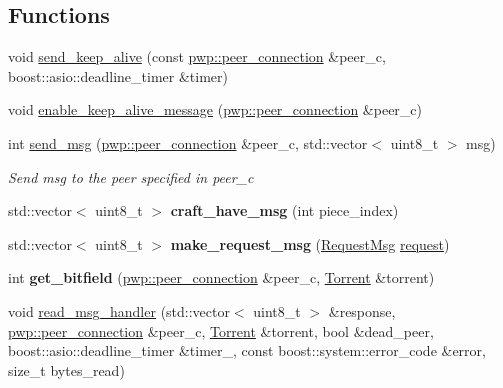 \subsection*{Functions}
\begin{DoxyCompactItemize}
\item 
void \hyperlink{namespacepwp__msg_a9a577f5a53b823d83bb4694f1ebf141e}{send\+\_\+keep\+\_\+alive} (const \hyperlink{structpwp_1_1peer__connection}{pwp\+::peer\+\_\+connection} \&peer\+\_\+c, boost\+::asio\+::deadline\+\_\+timer \&timer)
\item 
void \hyperlink{namespacepwp__msg_a30c14bc06a8bb851ca79781cb9686b4f}{enable\+\_\+keep\+\_\+alive\+\_\+message} (\hyperlink{structpwp_1_1peer__connection}{pwp\+::peer\+\_\+connection} \&peer\+\_\+c)
\item 
int \hyperlink{namespacepwp__msg_aca807c6281879abef952f8feecccb6e8}{send\+\_\+msg} (\hyperlink{structpwp_1_1peer__connection}{pwp\+::peer\+\_\+connection} \&peer\+\_\+c, std\+::vector$<$ uint8\+\_\+t $>$ msg)
\begin{DoxyCompactList}\small\item\em Send {\ttfamily msg} to the peer specified in {\ttfamily peer\+\_\+c} \end{DoxyCompactList}\item 
\mbox{\label{namespacepwp__msg_a529a3db7938ccfaab85579d58e24061e}} 
std\+::vector$<$ uint8\+\_\+t $>$ {\bfseries craft\+\_\+have\+\_\+msg} (int piece\+\_\+index)
\item 
\mbox{\label{namespacepwp__msg_a2dcbe5fbe0eeca8910340f4978ee4235}} 
std\+::vector$<$ uint8\+\_\+t $>$ {\bfseries make\+\_\+request\+\_\+msg} (\hyperlink{structRequestMsg}{Request\+Msg} \hyperlink{namespacepwp__msg_a0b9a29508f00a30e5138d2b78f4b1dafa4d6478c4fe948a9f3aa3ce8d09974370}{request})
\item 
\mbox{\label{namespacepwp__msg_aa9cc2ccac70638ed59075f27f938b8ec}} 
int {\bfseries get\+\_\+bitfield} (\hyperlink{structpwp_1_1peer__connection}{pwp\+::peer\+\_\+connection} \&peer\+\_\+c, \hyperlink{structTorrent}{Torrent} \&torrent)
\item 
void \hyperlink{namespacepwp__msg_aec35de04a2f2d9cb6abdd777917cfaae}{read\+\_\+msg\+\_\+handler} (std\+::vector$<$ uint8\+\_\+t $>$ \&response, \hyperlink{structpwp_1_1peer__connection}{pwp\+::peer\+\_\+connection} \&peer\+\_\+c, \hyperlink{structTorrent}{Torrent} \&torrent, bool \&dead\+\_\+peer, boost\+::asio\+::deadline\+\_\+timer \&timer\+\_\+, const boost\+::system\+::error\+\_\+code \&error, size\+\_\+t bytes\+\_\+read)

\end{DoxyCompactItemize}
